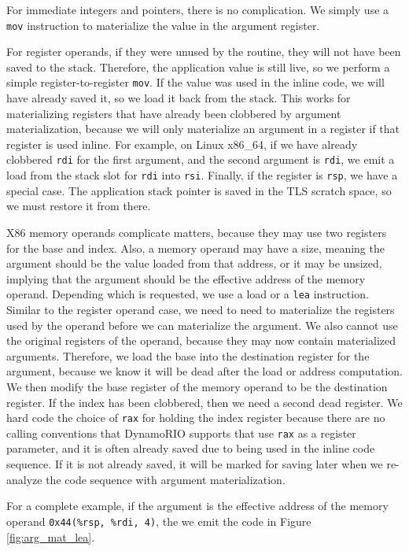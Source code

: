 For immediate integers and pointers, there is no complication.  We simply use a
{\tt mov} instruction to materialize the value in the argument register.

For register operands, if they were unused by the routine, they will not have
been saved to the stack.  Therefore, the application value is still live, so we
perform a simple register-to-register {\tt mov}.  If the value was used in the
inline code, we will have already saved it, so we load it back from the stack.
This works for materializing registers that have already been clobbered by
argument materialization, because we will only materialize an argument in a
register if that register is used inline.  For example, on Linux x86\_64, if we
have already clobbered {\tt rdi} for the first argument, and the second argument
is {\tt rdi}, we emit a load from the stack slot for {\tt rdi} into {\tt rsi}.
Finally, if the register is {\tt rsp}, we have a special case.  The application
stack pointer is saved in the TLS scratch space, so we must restore it from
there.

X86 memory operands complicate matters, because they may use two registers for
the base and index.  Also, a memory operand may have a size, meaning the
argument should be the value loaded from that address, or it may be unsized,
implying that the argument should be the effective address of the memory
operand.  Depending which is requested, we use a load or a {\tt lea}
instruction.  Similar to the register operand case, we need to need to
materialize the registers used by the operand before we can materialize the
argument.  We also cannot use the original registers of the operand, because
they may now contain materialized arguments.  Therefore, we load the base into
the destination register for the argument, because we know it will be dead after
the load or address computation.  We then modify the base register of the memory
operand to be the destination register.  If the index has been clobbered, then
we need a second dead register.  We hard code the choice of {\tt rax} for
holding the index register because there are no calling conventions that
DynamoRIO supports that use {\tt rax} as a register parameter, and it is often
already saved due to being used in the inline code sequence.  If it is not
already saved, it will be marked for saving later when we re-analyze the code
sequence with argument materialization.

For a complete example, if the argument is the effective address of the memory
operand {\tt 0x44(\%rsp, \%rdi, 4)}, the we emit the code in Figure
\ref{fig:arg_mat_lea}.

